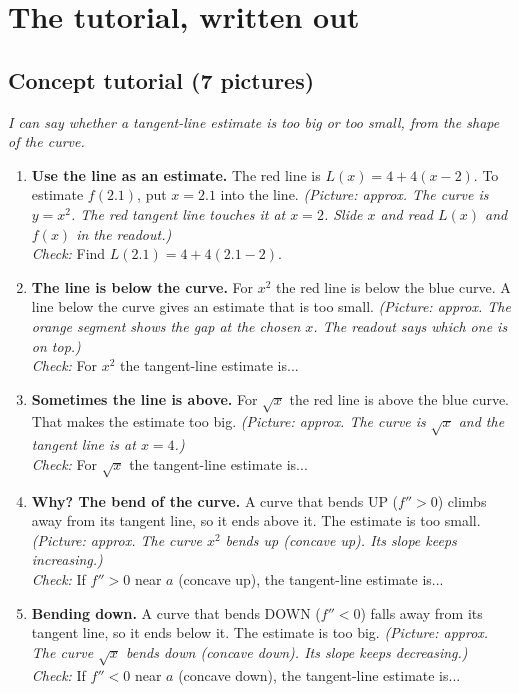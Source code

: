 \documentclass[11pt]{article}
\begin{document}
\section*{The tutorial, written out}
\subsection*{Concept tutorial (7 pictures)}
\textit{I can say whether a tangent-line estimate is too big or too small, from the shape of the curve.}\par
\begin{enumerate}
\item \textbf{Use the line as an estimate.} The red line is $L(x)=4+4(x-2)$. To estimate $f(2.1)$, put $x=2.1$ into the line. \textit{(Picture: approx. The curve is $y=x^2$. The red tangent line touches it at $x=2$. Slide $x$ and read $L(x)$ and $f(x)$ in the readout.)}\\ \textit{Check:} Find $L(2.1)=4+4(2.1-2)$. 
\item \textbf{The line is below the curve.} For $x^2$ the red line is below the blue curve. A line below the curve gives an estimate that is too small. \textit{(Picture: approx. The orange segment shows the gap at the chosen $x$. The readout says which one is on top.)}\\ \textit{Check:} For $x^2$ the tangent-line estimate is... 
\item \textbf{Sometimes the line is above.} For $\sqrt{x}$ the red line is above the blue curve. That makes the estimate too big. \textit{(Picture: approx. The curve is $\sqrt{x}$ and the tangent line is at $x=4$.)}\\ \textit{Check:} For $\sqrt{x}$ the tangent-line estimate is... 
\item \textbf{Why? The bend of the curve.} A curve that bends UP ($f''>0$) climbs away from its tangent line, so it ends above it. The estimate is too small. \textit{(Picture: approx. The curve $x^2$ bends up (concave up). Its slope keeps increasing.)}\\ \textit{Check:} If $f''>0$ near $a$ (concave up), the tangent-line estimate is... 
\item \textbf{Bending down.} A curve that bends DOWN ($f''<0$) falls away from its tangent line, so it ends below it. The estimate is too big. \textit{(Picture: approx. The curve $\sqrt{x}$ bends down (concave down). Its slope keeps decreasing.)}\\ \textit{Check:} If $f''<0$ near $a$ (concave down), the tangent-line estimate is... 

\end{enumerate}
\end{document}
